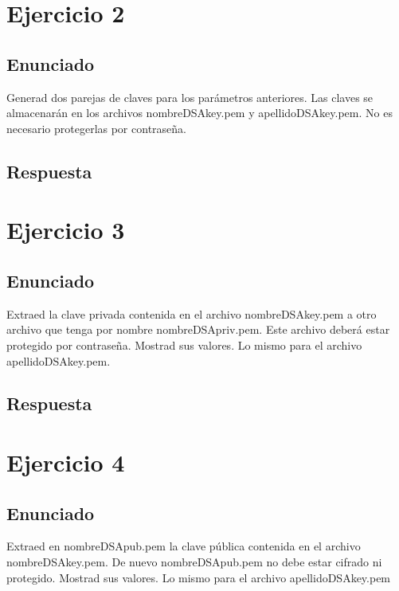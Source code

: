 \documentclass[10pt,a4paper,spanish]{report}
\begin{document}
\chapter{Ejercicio 2}

\section{Enunciado}
\noindent
Generad dos parejas de claves para los parámetros anteriores. Las claves se almacenarán en los archivos nombreDSAkey.pem y apellidoDSAkey.pem. No es necesario protegerlas por contraseña.

\section{Respuesta}
\noindent

\chapter{Ejercicio 3}

\section{Enunciado}
\noindent
Extraed la clave privada contenida en el archivo nombreDSAkey.pem a otro archivo que tenga por nombre nombreDSApriv.pem. Este archivo deberá estar protegido por contraseña. Mostrad sus valores. Lo mismo para el archivo apellidoDSAkey.pem.

\section{Respuesta}
\noindent

\chapter{Ejercicio 4}

\section{Enunciado}
\noindent
Extraed en nombreDSApub.pem la clave pública contenida en el archivo nombreDSAkey.pem. De nuevo nombreDSApub.pem no debe estar cifrado ni protegido. Mostrad sus valores. Lo mismo para el archivo apellidoDSAkey.pem
\end{document}
